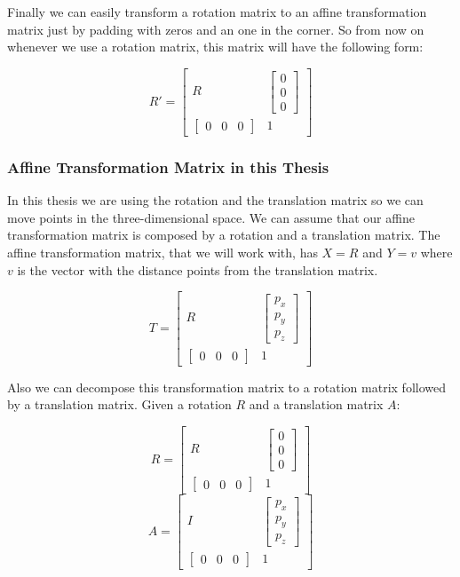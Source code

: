 Finally we can easily transform a rotation matrix to an affine transformation matrix just by padding with zeros and an one in the corner. So from now on whenever we use a rotation matrix, this matrix will have the following form:

\[
R' = 
\begin{bmatrix}
R &  \begin{bmatrix} 0\\0\\0 \end{bmatrix}\\
\begin{bmatrix}
0 & 0 & 0
\end{bmatrix} & 1
\end{bmatrix}
\]


\subsubsection*{Affine Transformation Matrix in this Thesis}
In this thesis we are using the rotation and the translation matrix so we can move points in the three-dimensional space. We can assume that our affine transformation matrix is composed by a rotation and a translation matrix. The affine transformation matrix, that we will work with, has \(X = R\) and \(Y = v\) where \(v\) is the vector with the distance points from the translation matrix.

\[
T = 
\begin{bmatrix}
R &  \begin{bmatrix} p_x\\p_y\\p_z \end{bmatrix}\\
\begin{bmatrix}
0 & 0 & 0
\end{bmatrix} & 1
\end{bmatrix}
\] 

Also we can decompose this transformation matrix to a rotation matrix followed by a translation matrix. Given a rotation \(R\) and a translation matrix \(A\):

\[R = 
\begin{bmatrix}
R &  \begin{bmatrix} 0\\0\\0 \end{bmatrix}\\
\begin{bmatrix}
0 & 0 & 0
\end{bmatrix} & 1
\end{bmatrix}
\]
\[A = 
\begin{bmatrix}
I &  \begin{bmatrix} p_x\\p_y\\p_z \end{bmatrix}\\
\begin{bmatrix}
0 & 0 & 0
\end{bmatrix} & 1
\end{bmatrix}
\]

